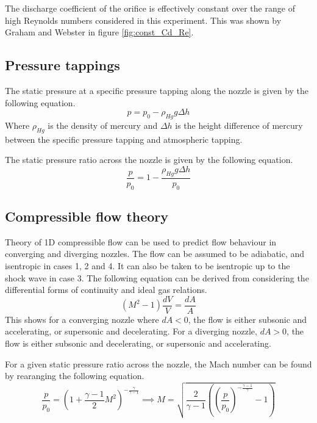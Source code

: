 \documentclass{article}
\begin{document}
The discharge coefficient of the orifice is effectively constant over the range of high Reynolds numbers considered in this experiment.
This was shown by Graham and Webster \cite{Graham_K_Webster:2019} in figure \ref{fig:const_Cd_Re}.

\subsection{Pressure tappings}

The static pressure at a specific pressure tapping along the nozzle is given by the following equation.
\begin{equation}
    p = p_0 - \rho_{Hg} g \Delta h
\end{equation}
Where $\rho_{Hg}$ is the density of mercury and $\Delta h$ is the height difference of mercury between the specific pressure tapping and atmospheric tapping.

The static pressure ratio across the nozzle is given by the following equation.
\begin{equation}
    \frac{p}{p_0} = 1 - \frac{\rho_{Hg} g \Delta h}{p_0}
\end{equation}

\subsection{Compressible flow theory}
Theory of 1D compressible flow can be used to predict flow behaviour in converging and diverging nozzles.
The flow can be assumed to be adiabatic, and isentropic in cases 1, 2 and 4.
It can also be taken to be isentropic up to the shock wave in case 3.
The following equation can be derived from considering the differential forms of continuity and ideal gas relations.
\begin{equation}
    (M^2 - 1)\frac{dV}{V} = \frac{dA}{A}
    \label{eqn:condiv_theory}
\end{equation}
This shows for a converging nozzle where $dA < 0$, the flow is either subsonic and accelerating, or supersonic and decelerating.
For a diverging nozzle, $dA > 0$, the flow is either subsonic and decelerating, or supersonic and accelerating.

For a given static pressure ratio across the nozzle, the Mach number can be found by rearanging the following equation.
\begin{equation}
    \frac{p}{p_0} = \left( 1 + \frac{\gamma - 1}{2}M^2\right) ^ {-\frac{\gamma}{\gamma-1}} \implies M = \sqrt{\frac{2}{\gamma-1} \left( \left( \frac{p}{p_0}\right) ^ {-\frac{\gamma-1}{\gamma}} - 1\right)}
\end{equation}
\end{document}
